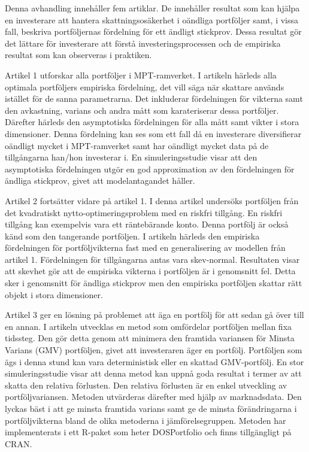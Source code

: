 \documentclass[12pt, oneside]{book}\usepackage{knitr}
\begin{document}
{Denna avhandling innehåller fem artiklar.
De innehåller resultat som kan hjälpa en investerare att hantera skattningsosäkerhet i oändliga portföljer samt, i vissa fall, beskriva portföljernas fördelning för ett ändligt stickprov.
Dessa resultat gör det lättare för investerare att förstå investeringsprocessen och de empiriska resultat som kan observeras i praktiken.

Artikel 1 utforskar alla portföljer i MPT-ramverket.
I artikeln härleds alla optimala portföljers empiriska fördelning, det vill säga när skattare används istället för de sanna parametrarna.
Det inkluderar fördelningen för vikterna samt den avkastning, varians och andra mått som karateriserar dessa portföljer.
Därefter härleds den asymptotiska fördelningen för alla mått samt vikter i stora dimensioner.
Denna fördelning kan ses som ett fall då en investerare diversifierar oändligt mycket i MPT-ramverket samt har oändligt mycket data på de tillgångarna han/hon investerar i.
En simuleringsstudie visar att den asymptotiska fördelningen utgör en god approximation av den fördelningen för ändliga stickprov, givet att modelantagandet håller.

Artikel 2 fortsätter vidare på artikel 1.
I denna artikel undersöks portföljen från det kvadratiskt nytto-optimeringsproblem med en riskfri tillgång. 
En riskfri tillgång kan exempelvis vara ett räntebärande konto.
Denna portfölj är också känd som den tangerande portföljen.
I artikeln härleds den empiriska fördelningen för portföljvikterna fast med en generalisering av modellen från artikel 1.
Fördelningen för tillgångarna antas vara skev-normal.
Resultaten visar att skevhet gör att de empiriska vikterna i portföljen är i genomsnitt fel.
Detta sker i genomsnitt för ändliga stickprov men den empiriska portföljen skattar rätt objekt i stora dimensioner. 

Artikel 3 ger en lösning på problemet att äga en portfölj för att sedan gå över till en annan.
I artikeln utvecklas en metod som omfördelar portföljen mellan fixa tidssteg.
Den gör detta genom att minimera den framtida variansen för Minsta Varians (GMV) portföljen, givet att investeraren äger en portfölj.
Portföljen som ägs i denna stund kan vara deterministisk eller en skattad GMV-portfölj.
En stor simuleringsstudie visar att denna metod kan uppnå goda resultat i termer av att skatta den relativa förlusten.
Den relativa förlusten är en enkel utveckling av portföljvariansen.
Metoden utvärderas därefter med hjälp av marknadsdata.
Den lyckas bäst i att ge minsta framtida varians samt ge de minsta förändringarna i portföljvikterna bland de olika metoderna i jämförelsegruppen.
Metoden har implementerats i ett R-paket som heter DOSPortfolio och finns tillgängligt på CRAN. 

}
\end{document}
